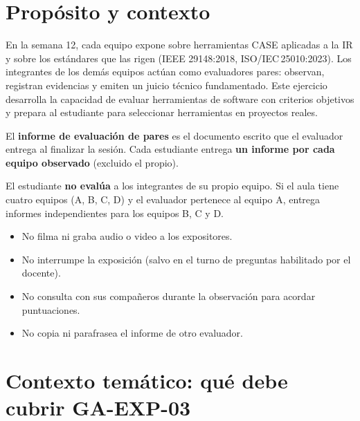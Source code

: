 \documentclass[11pt]{article}
\begin{document}
\newpage

\section{\textcolor{utegreendk}{Propósito y contexto}}

En la semana 12, cada equipo expone sobre herramientas CASE aplicadas a la IR y sobre los estándares que las rigen (IEEE 29148:2018, ISO/IEC\,25010:2023). Los integrantes de los demás equipos actúan como evaluadores pares: observan, registran evidencias y emiten un juicio técnico fundamentado. Este ejercicio desarrolla la capacidad de evaluar herramientas de software con criterios objetivos y prepara al estudiante para seleccionar herramientas en proyectos reales.

El \textbf{informe de evaluación de pares} es el documento escrito que el evaluador entrega al finalizar la sesión. Cada estudiante entrega \textbf{un informe por cada equipo observado} (excluido el propio).

\begin{cajaclave}[title=Regla de exclusión]
	El estudiante \textbf{no evalúa} a los integrantes de su propio equipo. Si el aula tiene cuatro equipos (A, B, C, D) y el evaluador pertenece al equipo A, entrega informes independientes para los equipos B, C y D.
\end{cajaclave}

\begin{cajaclave}[title=Qué NO debe hacer el evaluador]
	\begin{itemize}[leftmargin=14pt,itemsep=2pt]
		\item No filma ni graba audio o video a los expositores.
		\item No interrumpe la exposición (salvo en el turno de preguntas habilitado por el docente).
		\item No consulta con sus compañeros durante la observación para acordar puntuaciones.
		\item No copia ni parafrasea el informe de otro evaluador.
	\end{itemize}
\end{cajaclave}

\section{\textcolor{utegreendk}{Contexto temático: qué debe cubrir GA-EXP-03}}
\end{document}
